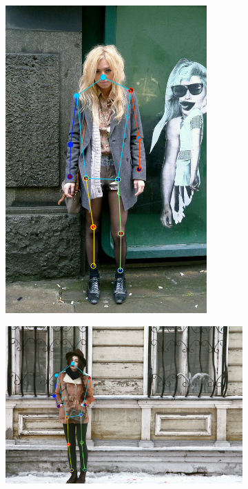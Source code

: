 \begin{figure}[t!]
\begin{subfigure}[b]{0.115\textwidth}
            \includegraphics[width=\textwidth]{resources/MotivativeAnnotation/FashionPose/bad_anno-3}
    \end{subfigure}
    \hfill
    \begin{subfigure}[b]{0.115\textwidth}
            \includegraphics[width=\textwidth]{resources/MotivativeAnnotation/FashionPose/bad_anno-4}

\end{subfigure}
\end{figure}
